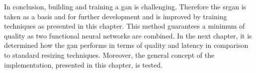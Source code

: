 \par
In conclusion, building and training a \gls{gan} is challenging. Therefore the \gls{srgan} is taken as a basis and for further development and is improved by training techniques as presented in this chapter. This method guarantees a minimum of quality as two functional neural networks are combined. In the next chapter, it is determined how the \gls{gan} performs in terms of quality and latency in comparison to standard resizing techniques. Moreover, the general concept of the implementation, presented in this chapter, is tested.